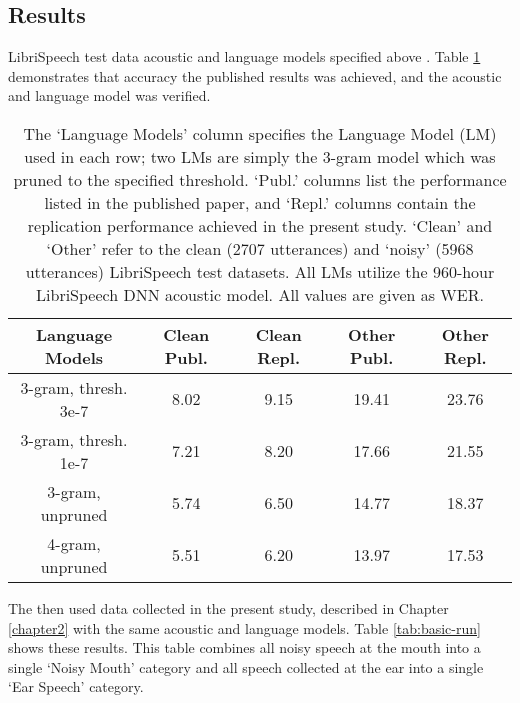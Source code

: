 \subsection{Results}
\DIFaddbegin \label{chap4:results}
\DIFaddend 

\DIFdelbegin {}\DIFdelend LibriSpeech test data \DIFdelbegin {}\DIFdelend \DIFaddbegin {}\DIFaddend acoustic and language models specified above \DIFaddbegin {}\DIFaddend .  Table \ref{tab:sanity-check} demonstrates that accuracy \DIFdelbegin {}\DIFdelend \DIFaddbegin {}\DIFaddend the published results was achieved, and the acoustic and language model \DIFdelbegin {}\DIFdelend \DIFaddbegin {}\DIFaddend was verified.

\begin{table}[h]
\begin{center}
\begin{tabular}{| c || c | c | c | c |} \hline
Language Models & Clean Publ. & Clean Repl. & Other Publ. & Other Repl. \\ \hline\hline
3-gram, thresh. 3e-7 & 8.02 & 9.15 & 19.41 & 23.76 \\ \hline
3-gram, thresh. 1e-7 & 7.21 & 8.20 & 17.66 & 21.55 \\ \hline
3-gram, unpruned & 5.74 & 6.50 & 14.77 & 18.37 \\ \hline
4-gram, unpruned & 5.51 & 6.20 & 13.97 & 17.53 \\ \hline
\end{tabular}
\end{center}
\caption{The `Language Models' column specifies the Language Model (LM) used in each row; two LMs are simply the 3-gram model which was pruned to the specified threshold.  `Publ.' columns list the performance listed in the published paper, and `Repl.' columns contain the replication performance achieved in the present study.  `Clean' and `Other' refer to the clean (2707 utterances) and `noisy' (5968 utterances) LibriSpeech test datasets. All LMs utilize the 960-hour LibriSpeech DNN acoustic model.  All values are given as WER.}\label{tab:sanity-check}
\end{table}

The \DIFdelbegin {}\DIFdelend \DIFaddbegin {}\DIFaddend then used data collected in the present study, described in Chapter \DIFdelbegin {}\DIFdelend \ref{chapter2} with the same acoustic and language models.  Table \ref{tab:basic-run} shows these results.  This table combines all noisy speech at the mouth into a single `Noisy Mouth' category and all speech collected at the ear into a single `Ear Speech' category.


